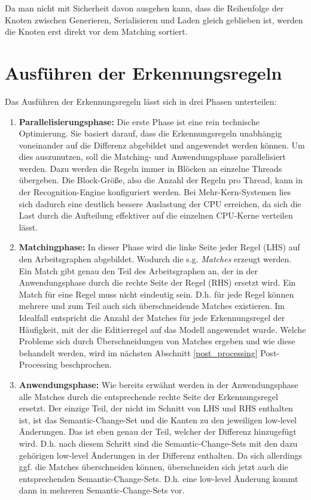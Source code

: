 Da man nicht mit Sicherheit davon ausgehen kann, dass die Reihenfolge der Knoten zwischen
Generieren, Serialisieren und Laden gleich geblieben ist, werden die Knoten erst direkt vor dem
Matching sortiert.

\section{Ausführen der Erkennungsregeln}

Das Ausführen der Erkennungsregeln lässt sich in drei Phasen unterteilen:

\begin{enumerate}
  \item \textbf{Parallelisierungsphase:} Die erste Phase ist eine rein technische Optimierung. Sie
  basiert darauf, dass die Erkennungsregeln unabhängig voneinander auf die Differenz abgebildet und
  angewendet werden können. Um dies auszunutzen, soll die Matching- und Anwendungsphase
  parallelisiert werden. Dazu werden die Regeln immer in Blöcken an einzelne Threads übergeben.
  Die Block-Größe, also die Anzahl der Regeln pro Thread, kann in der Recognition-Engine
  konfiguriert werden. Bei Mehr-Kern-Systemen lies sich dadurch eine deutlich bessere Auslastung der
  CPU erreichen, da sich die Last durch die Aufteilung effektiver auf die einzelnen CPU-Kerne
  verteilen lässt.
  
  \item \textbf{Matchingphase:} In dieser Phase wird die linke Seite jeder Regel (LHS) auf den
  Arbeitsgraphen abgebildet. Wodurch die s.g. \textit{Matches} erzeugt werden. Ein Match
  gibt genau den Teil des Arbeitsgraphen an, der in der Anwendungsphase durch die rechte Seite der
  Regel (RHS) ersetzt wird. Ein Match für eine Regel muss nicht eindeutig sein. D.h. für
  jede Regel können mehrere und zum Teil auch sich überschneidende Matches existieren. Im
  Idealfall entspricht die Anzahl der Matches für jede Erkennungsregel der Häufigkeit, mit
  der die Editierregel auf das Modell angewendet wurde. Welche Probleme sich durch Überschneidungen
  von Matches ergeben und wie diese behandelt werden, wird im nächsten Abschnitt 
  \ref{post_processing} Post-Processing beschprochen.
  
  \item \textbf{Anwendungsphase:} Wie bereits erwähnt werden in der Anwendungsphase alle Matches
  durch die entsprechende rechte Seite der Erkennungsregel ersetzt. Der einzige Teil, der nicht im
  Schnitt von LHS und RHS enthalten ist, ist das Semantic-Change-Set und die Kanten zu den
  jeweiligen low-level Änderungen. Das ist eben genau der Teil, welcher der Differenz hinzugefügt
  wird. D.h. nach diesem Schritt sind die Semantic-Change-Sets mit den dazu gehörigen low-level
  Änderungen in der Differenz enthalten. Da sich allerdings ggf. die Matches überschneiden können,
  überschneiden sich jetzt auch die entsprechenden Semantic-Change-Sets. D.h.
  eine low-level Änderung kommt dann in mehreren Semantic-Change-Sets vor.
\end{enumerate}

